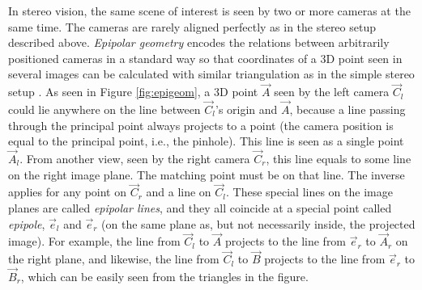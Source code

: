 
In stereo vision, the same scene of interest is seen by two or more cameras at the same time.
The cameras are rarely aligned perfectly as in the stereo setup described above.
\emph{Epipolar geometry} \cite[ch.~7.3]{trucco1998introductory} encodes the relations between arbitrarily positioned cameras in a standard way so that coordinates of a 3D point seen in several images can be calculated with similar triangulation as in the simple stereo setup \cite{trucco1998introductory,hartley03multiview}.
As seen in Figure \ref{fig:epigeom}, a 3D point $\vec A$ seen by the left camera $\vec C_l$ could lie anywhere on the line between $\vec C_l$'s origin and $\vec A$, because a line passing through the principal point always projects to a point (the camera position is equal to the principal point, i.e., the pinhole).
This line is seen as a single point $\vec A_l$.
From another view, seen by the right camera $\vec C_r$, this line equals to some line on the right image plane.
The matching point must be on that line.
The inverse applies for any point on $\vec C_r$ and a line on $\vec C_l$.
These special lines on the image planes are called \emph{epipolar lines}, and they all coincide at a special point called \emph{epipole}, $\vec e_l$ and $\vec e_r$ (on the same plane as, but not necessarily inside, the projected image).
For example, the line from $\vec C_l$ to $\vec A$ projects to the line from $\vec e_r$ to $\vec A_r$ on the right plane, and likewise, the line from $\vec C_l$ to $\vec B$ projects to the line from $\vec e_r$ to $\vec B_r$, which can be easily seen from the triangles in the figure.

